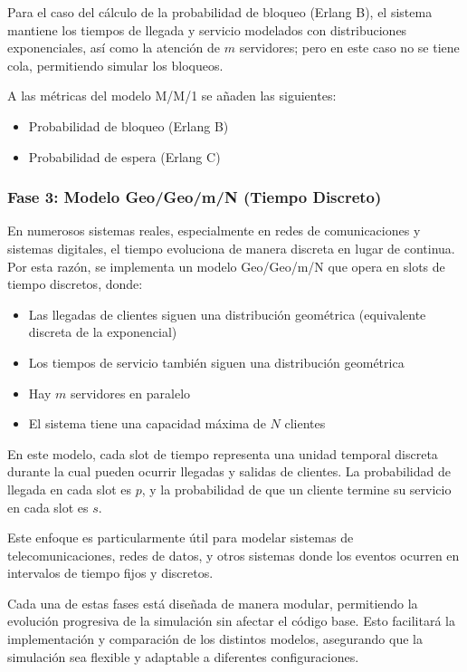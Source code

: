 \documentclass{article}
\begin{document}
Para el caso del cálculo de la probabilidad de bloqueo (Erlang B), el sistema mantiene los tiempos de llegada y servicio modelados con distribuciones exponenciales, así como la atención de $m$ servidores; pero en este caso no se tiene cola, permitiendo simular los bloqueos.

A las métricas del modelo M/M/1 se añaden las siguientes:
\begin{itemize}
    \item Probabilidad de bloqueo (Erlang B)
    \item Probabilidad de espera (Erlang C)
\end{itemize}

\subsubsection{Fase 3: Modelo Geo/Geo/m/N (Tiempo Discreto)}

En numerosos sistemas reales, especialmente en redes de comunicaciones y sistemas digitales, el tiempo evoluciona de manera discreta en lugar de continua. Por esta razón, se implementa un modelo Geo/Geo/m/N que opera en slots de tiempo discretos, donde:

\begin{itemize}
    \item Las llegadas de clientes siguen una distribución geométrica (equivalente discreta de la exponencial)
    \item Los tiempos de servicio también siguen una distribución geométrica  
    \item Hay $m$ servidores en paralelo
    \item El sistema tiene una capacidad máxima de $N$ clientes
\end{itemize}

En este modelo, cada slot de tiempo representa una unidad temporal discreta durante la cual pueden ocurrir llegadas y salidas de clientes. La probabilidad de llegada en cada slot es $p$, y la probabilidad de que un cliente termine su servicio en cada slot es $s$.

Este enfoque es particularmente útil para modelar sistemas de telecomunicaciones, redes de datos, y otros sistemas donde los eventos ocurren en intervalos de tiempo fijos y discretos.

Cada una de estas fases está diseñada de manera modular, permitiendo la evolución progresiva de la simulación sin afectar el código base. Esto facilitará la implementación y comparación de los distintos modelos, asegurando que la simulación sea flexible y adaptable a diferentes configuraciones.
\end{document}
